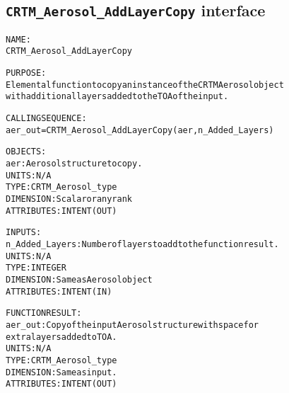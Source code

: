 \subsection{\texttt{CRTM\_Aerosol\_AddLayerCopy} interface}
  \label{sec:CRTM_Aerosol_AddLayerCopy_interface}
  \begin{alltt}
 
  NAME:
        CRTM_Aerosol_AddLayerCopy
 
  PURPOSE:
        Elemental function to copy an instance of the CRTM Aerosol object
        with additional layers added to the TOA of the input.
 
  CALLING SEQUENCE:
        aer_out = CRTM_Aerosol_AddLayerCopy( aer, n_Added_Layers )
 
  OBJECTS:
        aer:             Aerosol structure to copy.
                         UNITS:      N/A
                         TYPE:       CRTM_Aerosol_type
                         DIMENSION:  Scalar or any rank
                         ATTRIBUTES: INTENT(OUT)
 
  INPUTS:
        n_Added_Layers:  Number of layers to add to the function result.
                         UNITS:      N/A
                         TYPE:       INTEGER
                         DIMENSION:  Same as Aerosol object
                         ATTRIBUTES: INTENT(IN)
 
  FUNCTION RESULT:
        aer_out:         Copy of the input Aerosol structure with space for
                         extra layers added to TOA.
                         UNITS:      N/A
                         TYPE:       CRTM_Aerosol_type
                         DIMENSION:  Same as input.
                         ATTRIBUTES: INTENT(OUT)
 
 
  \end{alltt}

